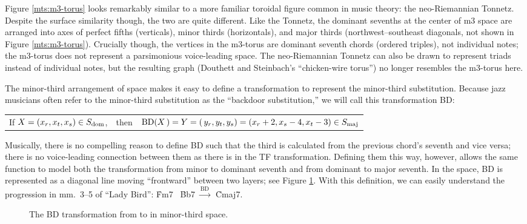 Figure \ref{mts:m3-torus} looks remarkably similar to a more familiar toroidal
figure common in music theory: the neo-Riemannian Tonnetz. Despite the surface
similarity though, the two are quite different. Like the Tonnetz, the dominant
sevenths at the center of m3 space are arranged into axes of perfect fifths
(verticals), minor thirds (horizontals), and major thirds (northwest--southeast
diagonals, not shown in Figure \ref{mts:m3-torus}). Crucially though, the
vertices in the m3-torus are dominant seventh chords (ordered triples), not
individual notes; the m3-torus does not represent a parsimonious voice-leading
space. The neo-Riemannian Tonnetz can also be drawn to represent triads instead of
individual notes, but the resulting graph (Douthett and Steinbach's
``chicken-wire torus'') no longer resembles the m3-torus here.

The minor-third arrangement of \tf space makes it easy to define a
transformation to represent the minor-third substitution. Because jazz
musicians often refer to the minor-third substitution as the ``backdoor
substitution,''  we will call this transformation BD: \\
%
\vspace{0.35\baselineskip}
\addtolength{\tabcolsep}{-3pt}
\begin{tabular}{lcl}
  If $X = (x_r, x_t, x_s) \in S_{\mathrm{dom}}$, & then &
    $\mathrm{BD}(X\,) = Y = (\,y_r, y_t, y_s) = (x_r + 2, x_s - 4, x_t - 3)
                                               \in S_{\mathrm{maj}}$
\end{tabular}
\addtolength{\tabcolsep}{3pt}
\vspace{0.5\baselineskip}

\noindent Musically, there is no compelling reason to define BD such that the
third is calculated from the previous chord's seventh and vice versa; there is
no voice-leading connection between them as there is in the TF transformation.
Defining them this way, however, allows the same function to model both the
transformation from minor to dominant seventh and from dominant to major
seventh. In the space, BD is represented as a diagonal line moving
``frontward'' between two layers; see Figure \ref{mts:bd-transformation}. With
this definition, we can easily understand the progression in mm.~3--5 of
``Lady Bird'': \h{Fm7} \TFarrow\ \h{Bb7} $\xrightarrow{\mathrm{BD}}$\
\h{Cmaj7}.

\begin{figure}[tbp]
  \caption[The BD transformation in m3 space.]{The BD transformation from
    \caph{Bb7} to \caph{Cmaj7} in minor-third space.}
  \label{mts:bd-transformation}
\end{figure}


